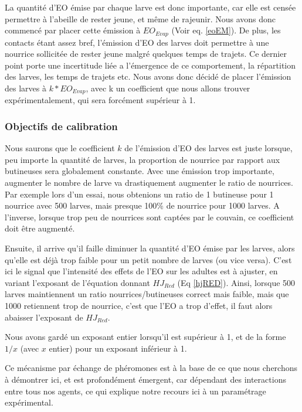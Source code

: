 \documentclass[11pt,a4paper]{report}
\begin{document}
	La quantité d'EO émise par chaque larve est donc importante, car elle est censée permettre à l'abeille de rester jeune, et même de rajeunir. Nous avons donc commencé par placer cette émission à $EO_{Evap}$ (Voir eq. \ref{eoEM}). De plus, les contacts étant assez bref, l'émission d'EO des larves doit permettre à une nourrice sollicitée de rester jeune malgré quelques temps de trajets. Ce dernier point porte une incertitude liée a l'émergence de ce comportement, la répartition des larves, les temps de trajets etc. Nous avons donc décidé de placer l'émission des larves à $k * EO_{Evap}$, avec k un coefficient que nous allons trouver expérimentalement, qui sera forcément supérieur à 1.
	
	\subsubsection{Objectifs de calibration}
	Nous saurons que le coefficient $k$ de l'émission d'EO des larves est juste lorsque, peu importe la quantité de larves, la proportion de nourrice par rapport aux butineuses sera globalement constante. Avec une émission trop importante, augmenter le nombre de larve va drastiquement augmenter le ratio de nourrices. Par exemple lors d'un essai, nous obtenions un ratio de 1 butineuse pour 1 nourrice avec 500 larves, mais presque 100\% de nourrice pour 1000 larves. A l'inverse, lorsque trop peu de nourrices sont captées par le couvain, ce coefficient doit être augmenté.
	
	Ensuite, il arrive qu'il faille diminuer la quantité d'EO émise par les larves, alors qu'elle est déjà trop faible pour un petit nombre de larves (ou vice versa). C'est ici le signal que l'intensité des effets de l'EO sur les adultes est à ajuster, en variant l'exposant de l'équation donnant $HJ_{Red}$ (Eq \ref{hjRED}). Ainsi, lorsque 500 larves maintiennent un ratio nourrices/butineuses correct mais faible, mais que 1000 retiennent trop de nourrice, c'est que l'EO a trop d'effet, il faut alors abaisser l'exposant de $HJ_{Red}$. 
	
	Nous avons gardé un exposant entier lorsqu'il est supérieur à 1, et de la forme $1/x$ (avec $x$ entier) pour un exposant inférieur à 1.
	
	
	Ce mécanisme par échange de phéromones est à la base de ce que nous cherchons à démontrer ici, et est profondément émergent, car dépendant des interactions entre tous nos agents, ce qui explique notre recours ici à un paramétrage expérimental.
	
	
\end{document}
